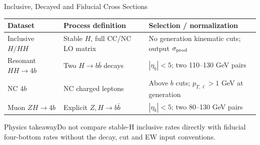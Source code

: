 \documentclass[aspectratio=1610,english]{beamer}
\newcommand{\src}[1]{\vfill{\par\color{black!65}\fontsize{6.4}{7.4}\selectfont\emph{Source:} #1\par}}
\newcommand{\key}[1]{\begin{alertblock}{Physics takeaway}\scriptsize #1\end{alertblock}}
\begin{document}
\begin{frame}[t]{Inclusive, Decayed and Fiducial Cross Sections}
\small

\begin{center}\setlength{\tabcolsep}{5pt}
\begin{tabular}{p{2.8cm}p{4.0cm}p{4.4cm}}\toprule
Dataset & Process definition & Selection / normalization\\\midrule
Inclusive $H/HH$ & Stable $H$, full CC/NC LO matrix & No generation kinematic cuts; output $\sigma_{\rm prod}$\\
Resonant $HH\to4b$ & Two $H\to b\bar b$ decays & $|\eta_b|<5$; two 110--130 GeV pairs\\
NC $4b$ & NC charged leptons & Above $b$ cuts; $p_{T,\ell}>1$ GeV at generation\\
Muon $ZH\to4b$ & Explicit $Z,H\to b\bar b$ & $|\eta_b|<5$; two 80--130 GeV pairs\\\bottomrule
\end{tabular}\end{center}
\key{Do not compare stable-H inclusive rates directly with fiducial four-bottom rates without the decay, cut and EW input conventions.}

\end{frame}
\end{document}
